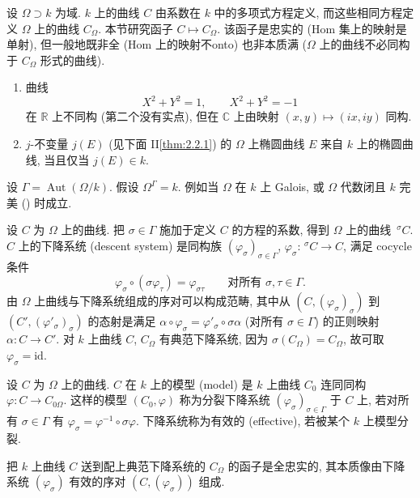 设 $\Omega\supset k$ 为域. $k$ 上的曲线 $C$ 由系数在 $k$ 中的多项式方程定义, 而这些相同方程定义 $\Omega$ 上的曲线 $C_\Omega$. 本节研究函子 $C\mapsto C_\Omega$. 该函子是忠实的 (Hom 集上的映射是单射), 但一般地既非全 (Hom 上的映射不onto) 也非本质满 ($\Omega$ 上的曲线不必同构于 $C_\Omega$ 形式的曲线).

\begin{example} \label{thm:1.5.1} 
\begin{enumerate}[label=\textup{(\alph*)}]
\item 曲线
\[
X^2 + Y^2 = 1, \qquad X^2 + Y^2 = -1
\]
在 $\mathbb{R}$ 上不同构 (第二个没有实点), 但在 $\mathbb{C}$ 上由映射 $(x,y)\mapsto(ix,iy)$ 同构.
\item $j$-不变量 $j(E)$ (见下面 II\ref{thm:2.2.1}) 的 $\Omega$ 上椭圆曲线 $E$ 来自 $k$ 上的椭圆曲线, 当且仅当 $j(E)\in k$.
\end{enumerate}
\end{example}

设 $\Gamma = \operatorname{Aut}(\Omega/k)$. 假设 $\Omega^\Gamma = k$. 例如当 $\Omega$ 在 $k$ 上 Galois, 或 $\Omega$ 代数闭且 $k$ 完美 (\cite[9.29]{milne-ft}) 时成立.

设 $C$ 为 $\Omega$ 上的曲线. 把 $\sigma\in\Gamma$ 施加于定义 $C$ 的方程的系数, 得到 $\Omega$ 上的曲线 $\,^\sigma C$. $C$ 上的下降系统 (descent system) 是同构族 $(\varphi_\sigma)_{\sigma\in\Gamma}$, $\varphi_\sigma\colon\,^\sigma C\to C$, 满足 cocycle 条件
\[
\varphi_\sigma\circ(\sigma\varphi_\tau) = \varphi_{\sigma\tau} \qquad \text{对所有 } \sigma,\tau\in\Gamma.
\]
由 $\Omega$ 上曲线与下降系统组成的序对可以构成范畴, 其中从 $(C, (\varphi_\sigma)_\sigma)$ 到 $(C', (\varphi'_\sigma)_\sigma)$ 的态射是满足 $\alpha\circ\varphi_\sigma = \varphi'_\sigma\circ\sigma\alpha$ (对所有 $\sigma\in\Gamma$) 的正则映射 $\alpha\colon C\to C'$. 对 $k$ 上曲线 $C$, $C_\Omega$ 有典范下降系统, 因为 $\sigma(C_\Omega) = C_\Omega$, 故可取 $\varphi_\sigma = \mathrm{id}$.

设 $C$ 为 $\Omega$ 上的曲线. $C$ 在 $k$ 上的模型 (model) 是 $k$ 上曲线 $C_0$ 连同同构 $\varphi\colon C\to C_{0\Omega}$. 这样的模型 $(C_0, \varphi)$ 称为分裂下降系统 $(\varphi_\sigma)_{\sigma\in\Gamma}$ 于 $C$ 上, 若对所有 $\sigma\in\Gamma$ 有 $\varphi_\sigma = \varphi^{-1}\circ\sigma\varphi$. 下降系统称为有效的 (effective), 若被某个 $k$ 上模型分裂.

\begin{proposition} \label{thm:1.5.2} 
把 $k$ 上曲线 $C$ 送到配上典范下降系统的 $C_\Omega$ 的函子是全忠实的, 其本质像由下降系统 $(\varphi_\sigma)$ 有效的序对 $(C, (\varphi_\sigma))$ 组成.
\end{proposition}

